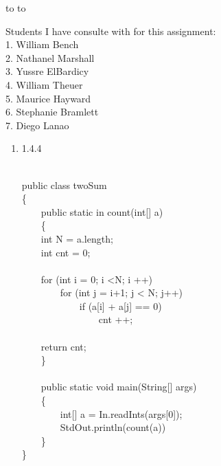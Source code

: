 \documentclass[11pt]{article}
\newcommand{\handout}{
   \renewcommand{\thepage}{H\hnumber-\arabic{page}}
   \noindent
   \begin{center}
      \vbox{
    \hbox to \columnwidth {\sc{\course} --- \prof \hfill}
    \vspace{-2mm}
    \hbox to \columnwidth {\sc due \MakeLowercase{\duedate} \duelocation\hfill {\Huge\color{mdb}H\hnumber.}}
	\vspace{15pt}
	{\Huge\yourname}
      }
   \end{center}
   \vspace*{2mm}
}
\begin{document}
\thispagestyle{empty}
\handout

Students I have consulte with for this assignment:\\
1. William Bench\\
2. Nathanel Marshall\\
3. Yussre ElBardicy\\
4. William Theuer\\
5. Maurice Hayward\\
6. Stephanie Bramlett\\
7. Diego Lanao\\

\begin{enumerate}

\item 1.4.4
\begin{solution}\\
public class twoSum\\
\{ \\
\-\ \-\ \-\ \-\ public static in count(int[] a) \\
 \-\ \-\ \-\ \-\ \{\\
		\-\ \-\ \-\ \-\ int N = a.length;\\
		\-\ \-\ \-\ \-\ int cnt = 0;\\
		\\
		\-\ \-\ \-\ \-\ for (int i = 0; i <N; i ++)\\
			\-\ \-\ \-\ \-\ \-\ \-\ \-\ \-\ for (int j = i+1; j < N; j++)\\
				\-\ \-\ \-\ \-\ \-\ \-\ \-\ \-\ \-\ \-\ \-\ \-\ if (a[i] + a[j] == 0)\\
		\-\ \-\ \-\ \-\  \-\ \-\ \-\ \-\ \-\ \-\ \-\ \-\ \-\ \-\ \-\ \-\ cnt ++;\\
		\\
		\-\ \-\ \-\ \-\ return cnt;\\
	\-\ \-\ \-\ \-\ \}\\
	\\
	\-\ \-\ \-\ \-\ public static void main(String[] args)\\
	\-\ \-\ \-\ \-\ \{\\
		\-\ \-\ \-\ \-\ \-\ \-\ \-\ \-\ int[] a = In.readInts(args[0]);\\
		\-\ \-\ \-\ \-\ \-\ \-\ \-\ \-\ StdOut.println(count(a))\\
	\-\ \-\ \-\ \-\ \}\\
\}\\


\end{solution}
\end{enumerate}
\end{document}
